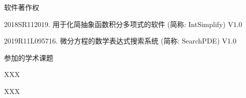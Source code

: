 \noindent 软件著作权
\begin{enumerate}[label={[\arabic*]},leftmargin=*]
\item 2018SR112019. 用于化简抽象函数积分多项式的软件 (简称: IntSimplify) V1.0
\item 2019R11L095716. 微分方程的数学表达式搜索系统 (简称: SearchPDE) V1.0
\end{enumerate}

\noindent 参加的学术课题
\begin{enumerate}[label={[\arabic*]},leftmargin=*]
\item XXX
\item XXX
\end{enumerate}

\fi
